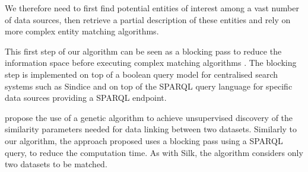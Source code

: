 We therefore need to first find potential entities of interest among a vast number of data sources, then retrieve a partial description of these entities and rely on more complex entity matching algorithms. 

This first step of our algorithm can be seen as a blocking pass to reduce the information space before executing complex matching algorithms \cite{Elmagarmid2007}. The blocking step is implemented on top of a boolean query model for centralised search systems such as Sindice \cite{Tummarello2007} and on top of the SPARQL query language for specific data sources providing a SPARQL endpoint.

\cite{Nikolov2012} propose the use of a genetic algorithm to achieve unsupervised discovery of the similarity parameters needed for data linking between two datasets. Similarly to our algorithm, the approach proposed uses a blocking pass using a SPARQL query, to reduce the computation time. As with Silk, the algorithm considers only two datasets to be matched.
